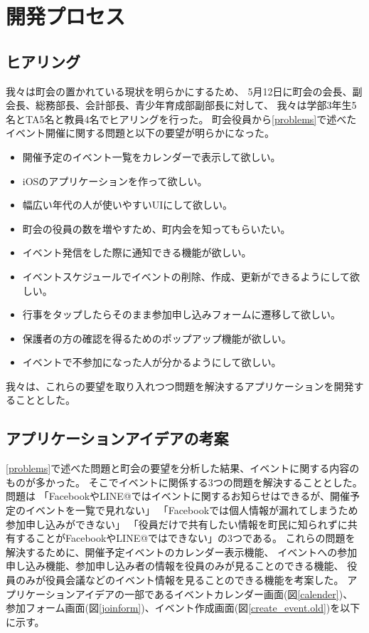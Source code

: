 \chapter{開発プロセス}

\section{ヒアリング}
我々は町会の置かれている現状を明らかにするため、
5月12日に町会の会長、副会長、総務部長、会計部長、青少年育成部副部長に対して、
我々は学部3年生5名とTA5名と教員4名でヒアリングを行った。
町会役員から\ref{problems}で述べたイベント開催に関する問題と以下の要望が明らかになった。

\begin{itemize}
\item 開催予定のイベント一覧をカレンダーで表示して欲しい。
\item iOSのアプリケーションを作って欲しい。
\item 幅広い年代の人が使いやすいUIにして欲しい。
\item 町会の役員の数を増やすため、町内会を知ってもらいたい。
\item イベント発信をした際に通知できる機能が欲しい。
\item イベントスケジュールでイベントの削除、作成、更新ができるようにして欲しい。
\item 行事をタップしたらそのまま参加申し込みフォームに遷移して欲しい。
\item 保護者の方の確認を得るためのポップアップ機能が欲しい。
\item イベントで不参加になった人が分かるようにして欲しい。
\end{itemize}

我々は、これらの要望を取り入れつつ問題を解決するアプリケーションを開発することとした。


\section{アプリケーションアイデアの考案}
\ref{problems}で述べた問題と町会の要望を分析した結果、イベントに関する内容のものが多かった。
そこでイベントに関係する3つの問題を解決することとした。問題は
「FacebookやLINE@ではイベントに関するお知らせはできるが、開催予定のイベントを一覧で見れない」
「Facebookでは個人情報が漏れてしまうため参加申し込みができない」
「役員だけで共有したい情報を町民に知られずに共有することがFacebookやLINE@ではできない」の3つである。
これらの問題を解決するために、開催予定イベントのカレンダー表示機能、
イベントへの参加申し込み機能、参加申し込み者の情報を役員のみが見ることのできる機能、
役員のみが役員会議などのイベント情報を見ることのできる機能を考案した。
アプリケーションアイデアの一部であるイベントカレンダー画面(図\ref{calender})、
参加フォーム画面(図\ref{joinform})、イベント作成画面(図\ref{create_event.old})を以下に示す。


